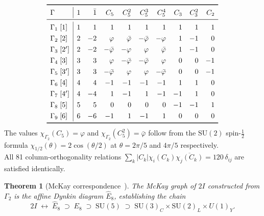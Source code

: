 \documentclass[11pt,a4paper]{article}
\newtheorem{theorem}{Theorem}[section]
\theoremstyle{definition}
\theoremstyle{remark}
\newcommand{\vp}{\varphi}
\begin{document}
\begin{equation}
\renewcommand{\arraystretch}{1.3}
\begin{array}{l|rrrrrrrrr}
\toprule
\Gamma & 1 & \bar{1} & C_5 & C_5^2 & C_5^3 & C_5^4 & C_3 & C_3^2 & C_2\\
\midrule
\Gamma_1\;[1]  & 1 & 1  & 1         & 1          & 1           & 1         & 1  &  1 &  1\\
\Gamma_2\;[2]  & 2 &-2  & \vp       & \bar\vp    & -\bar\vp    & -\vp      & 1  & -1 &  0\\
\Gamma_3\;[2'] & 2 &-2  & -\bar\vp  & -\vp       & \vp         & \bar\vp   & 1  & -1 &  0\\
\Gamma_4\;[3]  & 3 & 3  & \vp       & -\bar\vp   & -\bar\vp    & \vp       & 0  &  0 & -1\\
\Gamma_5\;[3'] & 3 & 3  & -\bar\vp  & \vp        & \vp         & -\bar\vp  & 0  &  0 & -1\\
\Gamma_6\;[4]  & 4 & 4  & -1        & -1         & -1          & -1        & 1  &  1 &  0\\
\Gamma_7\;[4'] & 4 &-4  & 1         & -1         & 1           & -1        & -1 &  1 &  0\\
\Gamma_8\;[5]  & 5 & 5  & 0         & 0          & 0           & 0         & -1 & -1 &  1\\
\Gamma_9\;[6]  & 6 &-6  & -1        & 1          & -1          & 1         & 0  &  0 &  0\\
\bottomrule
\end{array}
\label{P1:eq:chartable}
\end{equation}
The values $\chi_{\Gamma_2}(C_5)=\vp$ and $\chi_{\Gamma_2}(C_5^2)=\bar\vp$ follow from the $\mathrm{SU}(2)$ spin-$\tfrac{1}{2}$ formula $\chi_{1/2}(\theta)=2\cos(\theta/2)$ at $\theta=2\pi/5$ and $4\pi/5$ respectively.\\
All 81 column-orthogonality relations $\sum_k|C_k|\chi_i(C_k)\overline{\chi_j(C_k)} = 120\,\delta_{ij}$ are satisfied identically.

\begin{theorem}[McKay correspondence~\cite{McKay1980}]
\label{P1:thm:mckay}
The McKay graph of $2I$ constructed from $\Gamma_2$ is the affine Dynkin
diagram $\hat{E}_8$, establishing the chain
\begin{equation}
  2I \;\longleftrightarrow\; \hat{E}_8 \;\supset\;
  E_8 \;\supset\; \mathrm{SU}(5) \;\supset\;
  \mathrm{SU}(3)_C\times\mathrm{SU}(2)_L\times U(1)_Y.
  \label{P1:eq:chain}
\end{equation}
\end{theorem}
\end{document}
